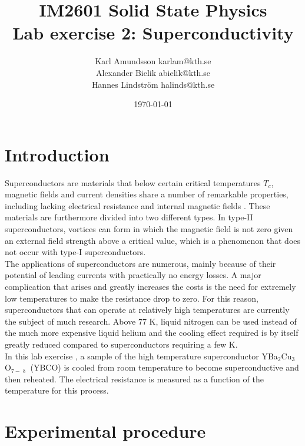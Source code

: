 \documentclass[12pt,a4paper]{article}
\begin{document}
\title{IM2601 Solid State Physics \\
Lab exercise 2: Superconductivity}
\author{Karl Amundsson karlam@kth.se\\
Alexander Bielik abielik@kth.se\\
Hannes Lindström halinds@kth.se}
\date{\today}
\maketitle
\thispagestyle{empty}

\newpage

\tableofcontents
\thispagestyle{empty}

\newpage
\setcounter{page}{1}

\section{Introduction}

Superconductors are materials that below certain critical temperatures $T_c$, magnetic fields and current densities share a number of remarkable properties, including lacking electrical resistance and internal magnetic fields \cite{kittel}. These materials are furthermore divided into two different types. In type-II superconductors, vortices can form in which the magnetic field is not zero given an external field strength above a critical value, which is a phenomenon that does not occur with type-I superconductors. \\

The applications of superconductors are numerous, mainly because of their potential of leading currents with practically no energy losses. A major complication that arises and greatly increases the costs is the need for extremely low temperatures to make the resistance drop to zero. For this reason, superconductors that can operate at relatively high temperatures are currently the subject of much research. Above 77 K, liquid nitrogen can be used instead of the much more expensive liquid helium and the cooling effect required is by itself greatly reduced compared to superconductors requiring a few K. \\

In this lab exercise \cite{lab_PM}, a sample of the high temperature superconductor YBa$_2$Cu$_3$O$_{7-\updelta}$ (YBCO) is cooled from room temperature to become superconductive and then reheated. The electrical resistance is measured as a function of the temperature for this process.

\section{Experimental procedure}
\end{document}

